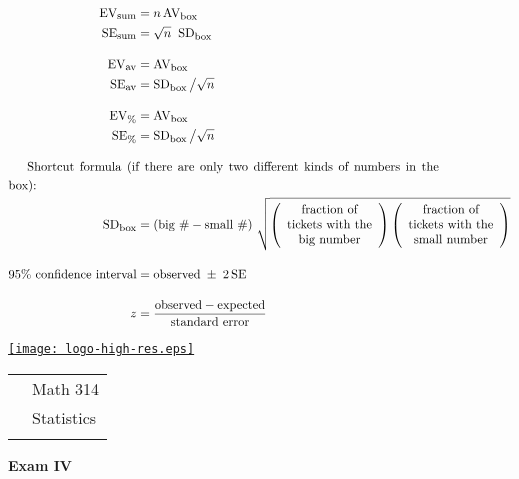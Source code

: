 \documentclass[10pt]{article}
\begin{document}
\begin{align*}
\mbox{EV}_{\mbox{\footnotesize sum}} & = n\,\mbox{AV}_{\mbox{\footnotesize box}}\\
\mbox{SE}_{\mbox{\footnotesize sum}} & = \sqrt{n}\;\;\mbox{SD}_{\mbox{\footnotesize box}}\\[10pt]
%
\mbox{EV}_{\mbox{\footnotesize av}} & = \mbox{AV}_{\mbox{\footnotesize box}}\\
\mbox{SE}_{\mbox{\footnotesize av}} & = \mbox{SD}_{\mbox{\footnotesize box}}\,\big{/}\sqrt{n}\\[10pt]
%
\mbox{EV}_{\mbox{\footnotesize \%}} & = \mbox{AV}_{\mbox{\footnotesize box}}\\
\mbox{SE}_{\mbox{\footnotesize \%}} & = \mbox{SD}_{\mbox{\footnotesize box}}\,\big{/}\sqrt{n}\\[10pt]
%
\noalign{Shortcut formula (if there are only two different kinds of numbers in the box):}
\mbox{SD}_{\mbox{\footnotesize box}} &=
  \left(\mbox{big \#} - \mbox{small \#}\right)\,\sqrt{
  \left(\begin{array}{c}\mbox{fraction of}\\ \mbox{tickets with the}\\ \mbox{big number}\end{array}\right)
  \left(\begin{array}{c}\mbox{fraction of}\\\mbox{tickets with the}\\\mbox{small number}\end{array}\right)}\\[10pt]
%
\mbox{95\% confidence interval} &= \mbox{observed} \;\pm\; 2\,\mbox{SE}\\[10pt]
z &= \frac{\mbox{observed} - \mbox{expected}}{\mbox{standard error}}
\end{align*}
\vfill
\eject


\href{http://www.shepherd.edu}{\texttt{[image: logo-high-res.eps]}}
\vspace{-1.69cm}

{\small
\begin{tabular}{cl}
& Math 314\\
& Statistics\\
\hspace{5.28in} & %
\end{tabular}
}
\begin{center}
\textbf{\large  Exam IV}
\end{center}
\medskip
\end{document}

